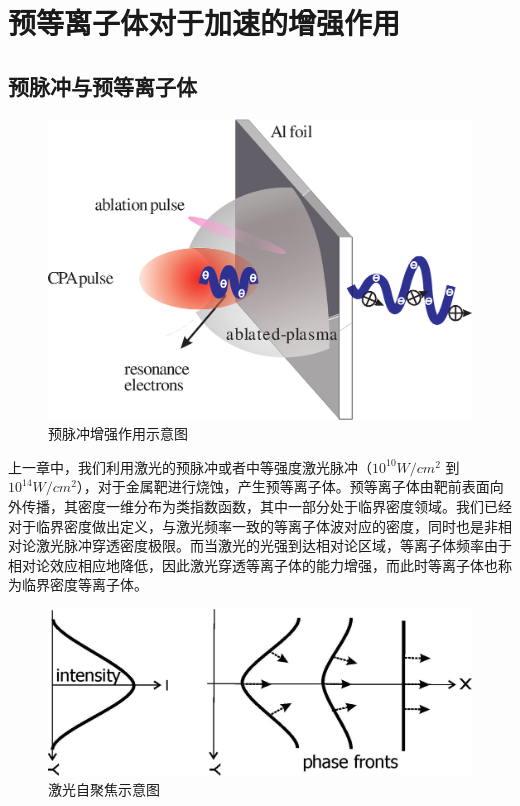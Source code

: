 

\chapter{预等离子体对于加速的增强作用}
\label{chap:preplasmaEhancement}

\section{预脉冲与预等离子体}
\begin{figure}[!htbp]
  \centering
  \includegraphics[width=\MyFactor\textwidth]{Img/enhancement.eps}
  \caption{预脉冲增强作用示意图}
  \label{fig:prepulse2012}
\end{figure}



上一章中，我们利用激光的预脉冲或者中等强度激光脉冲（$10^{10}W/cm^2$ 到 $10^{14}W/cm^2$），对于金属靶进行烧蚀，产生预等离子体。预等离子体由靶前表面向外传播，其密度一维分布为类指数函数，其中一部分处于临界密度领域。我们已经对于临界密度做出定义，与激光频率一致的等离子体波对应的密度，同时也是非相对论激光脉冲穿透密度极限。而当激光的光强到达相对论区域，等离子体频率由于相对论效应相应地降低，因此激光穿透等离子体的能力增强，而此时等离子体也称为临界密度等离子体。

\begin{figure}[!htbp]
  \centering
  \includegraphics[width=\MyFactor\textwidth]{Img/selffocussing.eps}
  \caption{激光自聚焦示意图}
  \label{fig:selffousing}
\end{figure}

